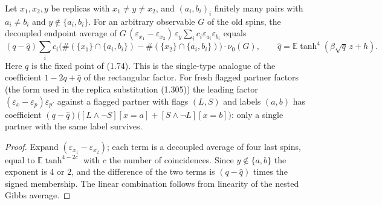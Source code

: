 \begin{theorem}
\label{thm:sg-tal:single-contraction}
\leanok
{}
Let $x_1,x_2,y$ be replicas with $x_1\ne y\ne x_2$, and $(a_i,b_i)_i$ finitely many pairs with
$a_i\ne b_i$ and $y\notin\{a_i,b_i\}$. For an arbitrary observable $G$ of the old spins, the
decoupled endpoint average of
$G\,(\varepsilon_{x_1}-\varepsilon_{x_2})\,\varepsilon_y\sum_ic_i\varepsilon_{a_i}\varepsilon_{b_i}$
equals
\[
 (q-\hat q)\sum_ic_i\big(\#(\{x_1\}\cap\{a_i,b_i\})-\#(\{x_2\}\cap\{a_i,b_i\})\big)
 \cdot\nu_0(G),\qquad \hat q=\mathbb E\tanh^4(\beta\sqrt q\,z+h).
\]
Here $q$ is the fixed point of (1.74). This is the single-type analogue of the coefficient
$1-2q+\hat q$ of the rectangular factor.
For fresh flagged partner factors (the form used in the replica substitution (1.305)) the
leading factor $(\varepsilon_x-\varepsilon_{p})\varepsilon_{p'}$ against a flagged partner with
flags $(L,S)$ and labels $(a,b)$ has coefficient
$(q-\hat q)\big([L\wedge\neg S][x=a]+[S\wedge\neg L][x=b]\big)$: only a single partner
with the same label survives.
\end{theorem}
\begin{proof}
\leanok
Expand $(\varepsilon_{x_1}-\varepsilon_{x_2})$; each term is a decoupled average of four last
spins, equal to $\mathbb E\tanh^{4-2c}$ with $c$ the number of coincidences. Since $y\notin\{a,b\}$ the
exponent is $4$ or $2$, and the difference of the two terms is $(q-\hat q)$ times the signed
membership. The linear combination follows from linearity of the nested Gibbs average.
\end{proof}

